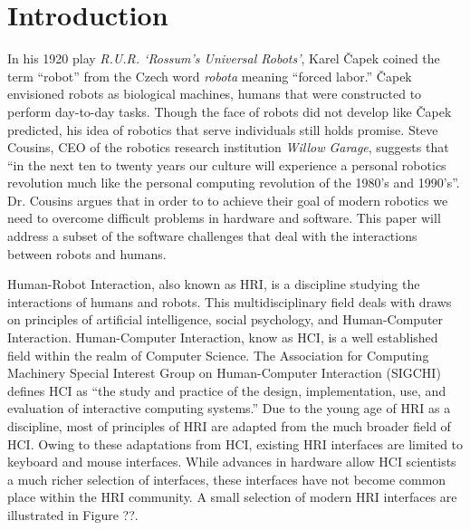 \chapter{Introduction}

In his 1920 play \emph{R.U.R. ‘Rossum's Universal Robots’}, Karel Čapek coined the term ``robot'' from the Czech word \emph{robota} meaning ``forced labor.'' Čapek envisioned robots as biological machines, humans that were constructed to perform day-to-day tasks. Though the face of robots did not develop like Čapek predicted, his idea of robotics that serve individuals still holds promise. Steve Cousins, CEO of the robotics research institution \emph{Willow Garage}, suggests that ``in the next ten to twenty years our culture will experience a personal robotics revolution much like the personal computing revolution of the 1980's and 1990's''. \cite{Cousins} Dr. Cousins argues that in order to to achieve their goal of modern robotics we need to overcome difficult problems in hardware and software. This paper will address a subset of the software challenges that deal with the interactions between robots and humans.

Human-Robot Interaction, also known as HRI, is a discipline studying the interactions of humans and robots. This multidisciplinary field deals with draws on principles of artificial intelligence, social psychology, and Human-Computer Interaction. Human-Computer Interaction, know as HCI, is a well established field within the realm of Computer Science. The Association for Computing Machinery Special Interest Group on Human-Computer Interaction (SIGCHI) defines HCI as ``the study and practice of the design, implementation, use, and evaluation of interactive computing systems.'' \cite{SIGCHI} Due to the young age of HRI as a discipline, most of principles of HRI are adapted from the much broader field of HCI. Owing to these adaptations from HCI, existing HRI interfaces are limited to keyboard and mouse interfaces. While advances in hardware allow HCI scientists a much richer selection of interfaces, these interfaces have not become common place within the HRI community. A small selection of modern HRI interfaces are illustrated in Figure ??.

